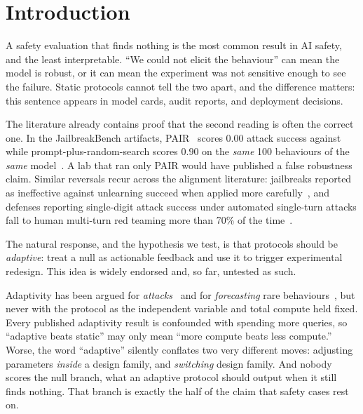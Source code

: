 \section{Introduction}
\label{sec:intro}

A safety evaluation that finds nothing is the most common result in AI safety, and the least
interpretable. ``We could not elicit the behaviour'' can mean the model is robust, or it can
mean the experiment was not sensitive enough to see the failure. Static protocols cannot tell
the two apart, and the difference matters: this sentence appears in model cards, audit reports,
and deployment decisions.

The literature already contains proof that the second reading is often the correct one. In the
JailbreakBench artifacts, PAIR~\cite{chao2023pair} scores $0.00$ attack success against
\llamaseven while prompt-plus-random-search scores $0.90$ on the \emph{same} 100 behaviours of
the \emph{same} model~\cite{chao2024jbb,andriushchenko2024adaptive}. A lab that ran only PAIR
would have published a false robustness claim. Similar reversals recur across the alignment
literature: jailbreaks reported as ineffective against unlearning succeed when applied more
carefully~\cite{lucki2024unlearning}, and defenses reporting single-digit attack success under
automated single-turn attacks fall to human multi-turn red teaming more than 70\% of the
time~\cite{li2024mhj}.

The natural response, and the hypothesis we test, is that protocols should be \emph{adaptive}:
treat a null as actionable feedback and use it to trigger experimental redesign. This idea is
widely endorsed and, so far, untested as such.

 Adaptivity has been argued for \emph{attacks}~\cite{andriushchenko2024adaptive}
and for \emph{forecasting} rare behaviours~\cite{jones2025forecasting}, but never with the
protocol as the independent variable and total compute held fixed. Every published adaptivity
result is confounded with spending more queries, so ``adaptive beats static'' may only mean
``more compute beats less compute.'' Worse, the word ``adaptive'' silently conflates two very
different moves: adjusting parameters \emph{inside} a design family, and \emph{switching} design
family. And nobody scores the null branch, \ie what an adaptive protocol should output when it
still finds nothing. That branch is exactly the half of the claim that safety cases rest on.

